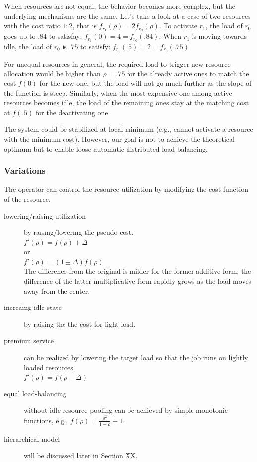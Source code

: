 When resources are not equal, the behavior becomes more complex, but
the underlying mechanisms are the same.
Let's take a look at a case of two resources with the cost ratio $1:2$,
that is $f_{r_1{}}(\rho) = 2 f_{r_{0}}(\rho)$.
To activate $r_{1}$, the load of $r_{0}$ goes up to $.84$ to satisfay:
$f_{r_{1}}(0) = 4 = f_{r_{0}}(.84)$.
When $r_{1}$ is moving towards idle, the load of $r_{0}$ is $.75$ to
satisfy: $f_{r_{1}}(.5) = 2 = f_{r_{0}}(.75)$

For unequal resources in general, the required load to trigger new
resource allocation would be higher than $\rho = .75$ for the already
active ones to match the cost $f(0)$ for the new one, but the load
will not go much further as the slope of the function is steep.
Similarly, when the most expensive one among active resources becomes
idle, the load of the remaining ones stay at the matching cost at
$f(.5)$ for the deactivating one. 

The system could be stabilized at local minimum (e.g., cannot activate
a resource with the minimum cost).
However, our goal is not to achieve the theoretical optimum but to
enable loose automatic distributed load balancing.

\subsubsection{Variations}

The operator can control the resource utilization by modifying the cost
function of the resource.

\begin{description}
\item[lowering/raising utilization] by raising/lowering the pseudo cost. \\
  $f'(\rho) = f(\rho) + \Delta$ \\
or \\
  $f'(\rho) = (1 \pm \Delta)f(\rho)$ \\
The difference from the original is milder for the former additive
form; the difference of the latter multiplicative form rapidly grows
as the load moves away from the center.

\item[increaing idle-state] by raising the the cost for light load.
\item[premium service] can be realized by lowering the target load so
  that the job runs on lightly loaded resources. \\
  $f'(\rho) = f(\rho - \Delta)$
\item[equal load-balancing] without idle resource pooling can be
  achieved by simple monotonic functions, e.g.,
  $f(\rho) = \frac{\rho^{2}}{1 - \rho} + 1$.
\item[hierarchical model] will be discussed later in Section XX.
\end{description}


